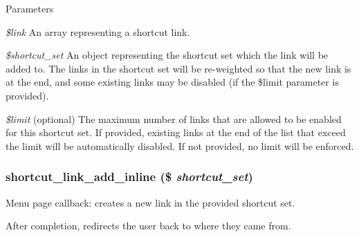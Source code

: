 \begin{DoxyParams}{Parameters}
\item[{\em \$link}]An array representing a shortcut link. \item[{\em \$shortcut\_\-set}]An object representing the shortcut set which the link will be added to. The links in the shortcut set will be re-\/weighted so that the new link is at the end, and some existing links may be disabled (if the \$limit parameter is provided). \item[{\em \$limit}](optional) The maximum number of links that are allowed to be enabled for this shortcut set. If provided, existing links at the end of the list that exceed the limit will be automatically disabled. If not provided, no limit will be enforced. \end{DoxyParams}
\hypertarget{shortcut_8admin_8inc_aa3e444869d8ab35d6c6c22ad47430c72}{
\subsubsection[{shortcut\_\-link\_\-add\_\-inline}]{\setlength{\rightskip}{0pt plus 5cm}shortcut\_\-link\_\-add\_\-inline (\$ {\em shortcut\_\-set})}}
\label{shortcut_8admin_8inc_aa3e444869d8ab35d6c6c22ad47430c72}
Menu page callback: creates a new link in the provided shortcut set.

After completion, redirects the user back to where they came from.


